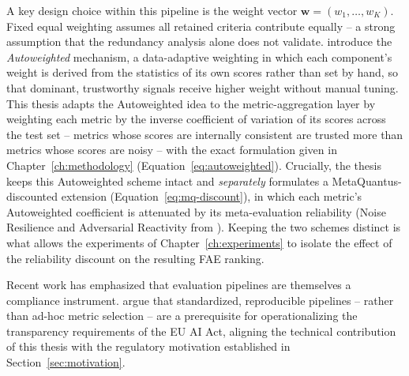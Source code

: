 A key design choice within this pipeline is the weight vector
$\mathbf{w} = (w_1, \dots, w_K)$. Fixed equal weighting assumes all retained
criteria contribute equally -- a strong assumption that the redundancy analysis
alone does not validate. \citet{hryniewska2024normensemblexai} introduce the
\emph{Autoweighted} mechanism, a data-adaptive weighting in which each
component's weight is derived from the statistics of its own scores rather
than set by hand, so that dominant, trustworthy signals receive higher weight
without manual tuning. This thesis adapts the Autoweighted idea to the
metric-aggregation layer by weighting each metric by the inverse coefficient
of variation of its scores across the test set -- metrics whose scores are
internally consistent are trusted more than metrics whose scores are
noisy -- with the exact formulation given in Chapter~\ref{ch:methodology}
(Equation~\eqref{eq:autoweighted}). Crucially, the thesis keeps this
Autoweighted scheme intact and \emph{separately} formulates a
MetaQuantus-discounted extension (Equation~\eqref{eq:mq-discount}), in which
each metric's Autoweighted coefficient is attenuated by its meta-evaluation
reliability (Noise Resilience and Adversarial Reactivity from
\citet{hedstrom2024metaquantus}). Keeping the two schemes distinct is what
allows the experiments of Chapter~\ref{ch:experiments} to isolate the effect
of the reliability discount on the resulting FAE ranking.

Recent work has emphasized that evaluation pipelines are themselves a
compliance instrument. \citet{seth2025bridging} argue that standardized,
reproducible pipelines -- rather than ad-hoc metric selection -- are a
prerequisite for operationalizing the transparency requirements of the EU AI
Act, aligning the technical contribution of this thesis with the regulatory
motivation established in Section~\ref{sec:motivation}.
